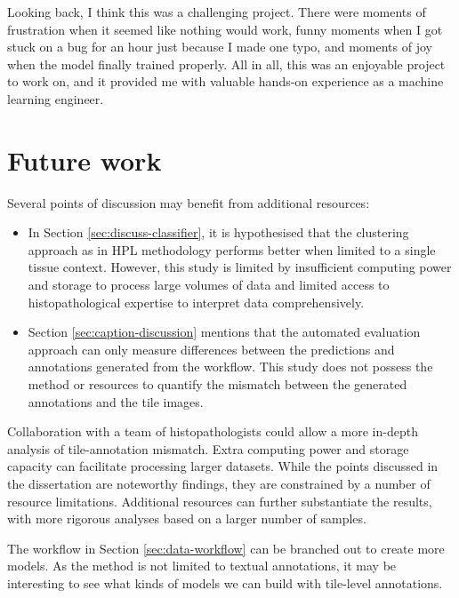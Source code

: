 \documentclass{l4proj}
\begin{document}
Looking back, I think this was a challenging project. There were moments of frustration when it seemed like nothing would work, funny moments when I got stuck on a bug for an hour just because I made one typo, and moments of joy when the model finally trained properly. All in all, this was an enjoyable project to work on, and it provided me with valuable hands-on experience as a machine learning engineer.

\section{Future work} \label{sec:future-work}
Several points of discussion may benefit from additional resources:
\begin{itemize}
    \item In Section \ref{sec:discuss-classifier}, it is hypothesised that the clustering approach as in HPL methodology performs better when limited to a single tissue context. However, this study is limited by insufficient computing power and storage to process large volumes of data and limited access to histopathological expertise to interpret data comprehensively.
    
    \item Section \ref{sec:caption-discussion} mentions that the automated evaluation approach can only measure differences between the predictions and annotations generated from the workflow. This study does not possess the method or resources to quantify the mismatch between the generated annotations and the tile images.
\end{itemize} 
Collaboration with a team of histopathologists could allow a more in-depth analysis of tile-annotation mismatch. Extra computing power and storage capacity can facilitate processing larger datasets. While the points discussed in the dissertation are noteworthy findings, they are constrained by a number of resource limitations. Additional resources can further substantiate the results, with more rigorous analyses based on a larger number of samples.

The workflow in Section \ref{sec:data-workflow} can be branched out to create more models. As the method is not limited to textual annotations, it may be interesting to see what kinds of models we can build with tile-level annotations.
\end{document}
